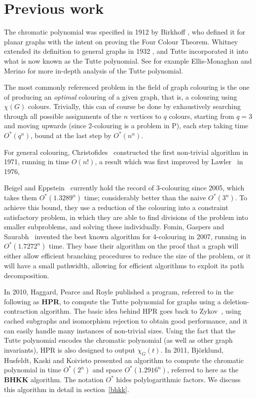 \documentclass{cslthse-msc}
\begin{document}
\section{Previous work}
The chromatic polynomial was specified in 1912 by Birkhoff \cite{birkhoff}, who defined it for planar graphs with the intent on proving the Four Colour Theorem. Whitney extended its definition to general graphs in 1932 \cite{whitney}, and Tutte incorporated it into what is now known as the Tutte polynomial. See for example Ellis-Monaghan and Merino \cite{tuttebook} for more in-depth analysis of the Tutte polynomial.

The most commonly referenced problem in the field of graph colouring is the one of producing an \emph{optimal} colouring of a given graph, that is, a colouring using $\chi(G)$ colours. Trivially, this can of course be done by exhaustively searching through all possible assignments of the $n$ vertices to $q$ colours, starting from $q = 3$ and moving upwards (since 2-colouring is a problem in P), each step taking time $O^*(q^n)$, bound at the last step by $O^*(n^n)$. 

For general colouring, Christofides~\cite{christo} constructed the first non-trivial algorithm in 1971, running in time $O(n!)$, a result which was first improved by Lawler~\cite{lawler} in 1976, 


Beigel and Eppstein~\cite{3coloring} currently hold the record of 3-colouring since 2005, which takes them $O^*(1.3289^n)$ time; considerably better than the naive $O^*(3^n)$. To achieve this bound, they use a reduction of the colouring into a constraint satisfactory problem, in which they are able to find divisions of the problem into smaller subproblems, and solving these individually.
Fomin, Gaspers and Saurabh~\cite{4coloring} invented the best known algorithm for 4-colouring in 2007, running in $O^*(1.7272^n)$ time. They base their algorithm on the proof that a graph will either allow efficient branching procedures to reduce the size of the problem, or it will have a small pathwidth, allowing for efficient algorithms to exploit its path decomposition.

In 2010, Haggard, Pearce and Royle \cite{haggard} published a program, referred to in the following as \textbf{HPR}, to compute the Tutte polynomial for graphs using a deletion-contraction algorithm. The basic idea behind HPR goes back to Zykov~\cite{aazykov}, using cached subgraphs and isomorphism rejection to obtain good performance, and it can easily handle many instances of non-trivial sizes. Using the fact that the Tutte polynomial encodes the chromatic polynomial (as well as other graph invariants), HPR is also designed to output $\chi_G(t)$.
In 2011, Björklund, Husfeldt, Kaski and Koivisto \cite{cov_pack} presented an algorithm to compute the chromatic polynomial in time $O^*(2^n)$ and space $O^*(1.2916^n)$, referred to here as the \textbf{BHKK} algorithm. The notation $O^*$ hides polylogarithmic factors. We discuss this algorithm in detail in section~\ref{bhkk}.
\end{document}
